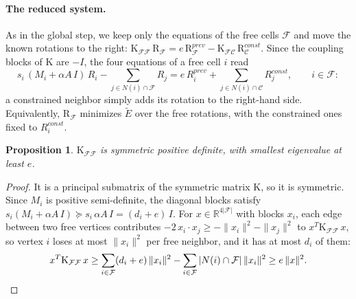 \documentclass{birkjour}
\newtheorem{prop}[thm]{Proposition}
\theoremstyle{remark}
\numberwithin{equation}{section}
\begin{document}
\paragraph{The reduced system.} As in the global step, we keep only the equations of the free cells $\mathcal F$ and move the known rotations to the right: $\mathrm K_{\mathcal F \mathcal F} \, \mathrm R_{\mathcal F} = e \, \mathrm R^{prev}_{\mathcal F} - \mathrm K_{\mathcal F \mathcal C} \, \mathrm R^{const}_{\mathcal C}$. Since the coupling blocks of $\mathrm K$ are $-I$, the four equations of a free cell $i$ read
\begin{equation}
\label{eqn:local_reduced}
s_i \, (M_i + \alpha A \, I) \, R_i - \sum_{j \in N(i) \cap \mathcal F} R_j = e \, R^{prev}_i + \sum_{j \in N(i) \cap \mathcal C} R^{const}_j , \qquad i \in \mathcal F:
\end{equation}
a constrained neighbor simply adds its rotation to the right-hand side. Equivalently, $\mathrm R_{\mathcal F}$ minimizes $\tilde E$ over the free rotations, with the constrained ones fixed to $R^{const}_i$.

\begin{prop}
\label{prop:rotation_spd}
$\mathrm K_{\mathcal F \mathcal F}$ is symmetric positive definite, with smallest eigenvalue at least $e$.
\end{prop}
\begin{proof}
It is a principal submatrix of the symmetric matrix $\mathrm K$, so it is symmetric. Since $M_i$ is positive semi-definite, the diagonal blocks satisfy $s_i (M_i + \alpha A \, I) \succeq s_i \, \alpha A \, I = (d_i + e) \, I$. For $x \in \mathbb R^{4 |\mathcal F|}$ with blocks $x_i$, each edge between two free vertices contributes $-2 \, x_i \cdot x_j \geq -\|x_i\|^2 - \|x_j\|^2$ to $x^T \mathrm K_{\mathcal F \mathcal F} \, x$, so vertex $i$ loses at most $\|x_i\|^2$ per free neighbor, and it has at most $d_i$ of them:
\begin{equation*}
x^T \mathrm K_{\mathcal F \mathcal F} \, x \geq \sum_{i \in \mathcal F} (d_i + e) \, \|x_i\|^2 - \sum_{i \in \mathcal F} |N(i) \cap \mathcal F| \, \|x_i\|^2 \geq e \, \|x\|^2 . \qedhere
\end{equation*}
\end{proof}
\end{document}
